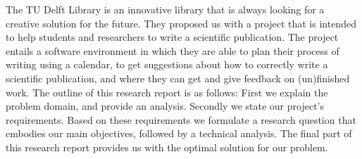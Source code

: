 The TU Delft Library is an innovative library that is always looking for a creative solution for the future. They proposed us with a project that is intended to help students and researchers to write a scientific publication. The project entails a software environment in which they are able to plan their process of writing using a calendar, to get suggestions about how to correctly write a scientific publication, and where they can get and give feedback on (un)finished work.
The outline of this research report is as follows: First we explain the problem domain, and provide an analysis. Secondly we state our project's requirements. Based on these requirements we formulate a research question that embodies our main objectives, followed by a technical analysis. The final part of this research report provides us with the optimal solution for our problem.